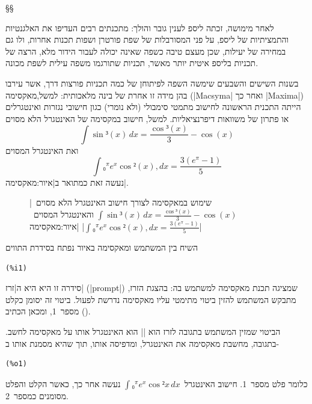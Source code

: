 §§ 

לאחר מימושה, זכתה ליספ לענין גובר והולך: מתכנתים רבים העדיפו את האלגנטיות
והתמציתיות של ליספ, על פני המסורבלות של שפת פורטרן ושפות תכנות אחרות, ולו גם
במחירה של יעילות, שכן מעצם טיבה כשפה שאינה יכולה לעבור הידור מלא, הרצה של
תכניות בליספ איטית יותר מאשר, תכניות שתורגמו משפה עילית לשפת מכונה.


בשנות השישים והשבעים שימשה השפה לפיתוחן של כמה תכניות פורצות דרך, אשר עירבו בהן
מידה זו אחרת של בינה מלאכותית: למשל,מאקסימה (\E|Macsyma| ואחר כך \E|Maxima|)
הייתה התכנית הראשונה לחישוב מתמטי סימבולי (ולא נומרי) כגון חישובי נגזרות
ואינטגרלים או פתרון של משוואות דיפרנציאליות. למשל, חישוב במקסימה של האינטגרל
הלא מסוים
\begin{equation}
  \label{eq:indefinite}
  ∫\sin³(x)\, dx=\frac{\cos³(x)}3- \cos(x)
\end{equation}
ואת האינטגרל המסוים
\begin{equation}
  \label{eq:definite}
  ∫₀^π e^x\cos²(x),dx=\frac{3 (e^π-1)}{5}
\end{equation} נעשה זאת כמתואר ב|איור:מאקסימה|.

\begin{figure}[H]
\begin{LTR}
  
\end{LTR}
|שימוש במאקסימה לצורך חישוב האינטגרל הלא
מסוים~$∫\sin³(x)\,dx=\frac{\cos³(x)}3-\cos(x)$ והאינטגרל
המסוים~$∫₀^π e^x\cos²(x),dx=\frac{3(e^π-1)}{5}$|
|איור:מאקסימה|
\end{figure}
השיח בין המשתמש ומאקסימה באיור נפתח בסידרת התווים
\begin{LTR}
\begin{lstlisting}[style=interaction,backgroundcolor=\color{white}]
(%i1)
\end{lstlisting}
\end{LTR}
סידרה זו היא היא ה\ע|זרז| (\E|prompt|) שמציגה תכנת מאקסימה למשתמש בה: בהצגת
הזרז, מתבקש המשתמש להזין ביטוי מתימטי עליו מאקסימה נדרשת לפעול. ביטוי זה יסומן
כקלט מספר~1, ומכאן הכתיב
().

הביטוי שמזין המשתמש בתגובה לזרז הוא \E|| הוא
האינטגרל אותו על מאקסימה לחשב. בתגובה, מחשבת מאקסימה את האינטגרל, ומדפיסה אותו,
תוך שהיא מסמנת אותו ב-
\begin{LTR}
\begin{lstlisting}[style=interaction,backgroundcolor=\color{white}]
(%o1)
\end{lstlisting}
\end{LTR}
 כלומר פלט מספר~1. חישוב האינטגרל~$∫₀^πe^x\cos²x\,dx$ נעשה אחר כך, כאשר הקלט
 והפלט מסומנים כמספר~2.

